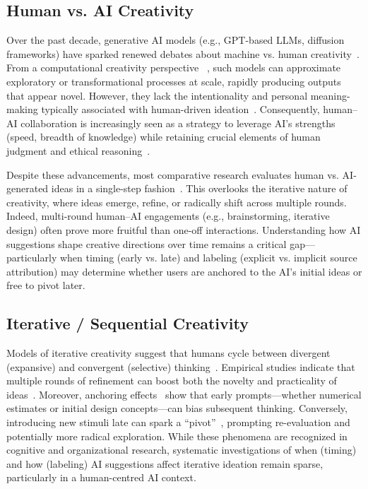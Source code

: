 \documentclass{article}
\begin{document}
\subsection{Human vs. AI Creativity}
Over the past decade, generative AI models (e.g., GPT-based LLMs, diffusion frameworks) have sparked renewed debates about machine vs. human creativity~\cite{farina2024machine,dwivedi2023human}. From a computational creativity perspective ~\cite{boden2008computers,lamb2018evaluating}, such models can approximate exploratory or transformational processes at scale, rapidly producing outputs that appear novel. However, they lack the intentionality and personal meaning-making typically associated with human-driven ideation~\cite{polster2024ai}. Consequently, human–AI collaboration is increasingly seen as a strategy to leverage AI’s strengths (speed, breadth of knowledge) while retaining crucial elements of human judgment and ethical reasoning~\cite{ali2023using}.

Despite these advancements, most comparative research evaluates human vs. AI-generated ideas in a single-step fashion~\cite{braun2024can,ragot2020ai}. This overlooks the iterative nature of creativity, where ideas emerge, refine, or radically shift across multiple rounds. Indeed, multi-round human–AI engagements (e.g., brainstorming, iterative design) often prove more fruitful than one-off interactions. Understanding how AI suggestions shape creative directions over time remains a critical gap—particularly when timing (early vs. late) and labeling (explicit vs. implicit source attribution) may determine whether users are anchored to the AI’s initial ideas or free to pivot later.
\subsection{Iterative / Sequential Creativity}
Models of iterative creativity suggest that humans cycle between divergent (expansive) and convergent (selective) thinking~\cite{sawyer2024explaining}. Empirical studies indicate that multiple rounds of refinement can boost both the novelty and practicality of ideas~\cite{dean2006identifying,paulus2000idea,harvey2014creative}. Moreover, anchoring effects~\cite{furnham2011literature} show that early prompts—whether numerical estimates or initial design concepts—can bias subsequent thinking. Conversely, introducing new stimuli late can spark a “pivot”~\cite{dorner2017complex}, prompting re-evaluation and potentially more radical exploration. While these phenomena are recognized in cognitive and organizational research, systematic investigations of when (timing) and how (labeling) AI suggestions affect iterative ideation remain sparse, particularly in a human-centred AI context.
\end{document}
